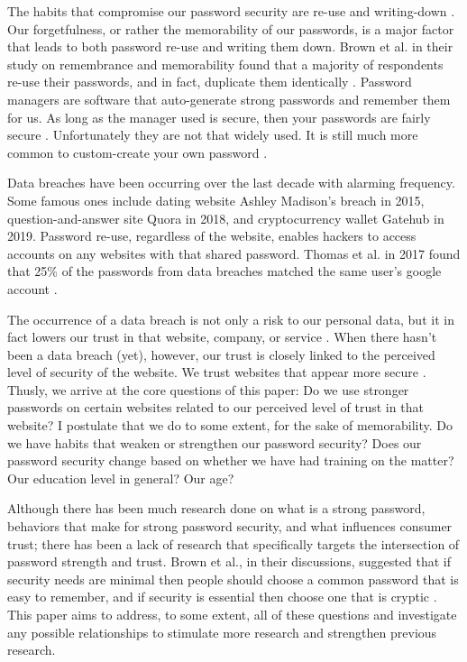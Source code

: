\documentclass[letterpaper, 10 pt, conference]{ieeeconf}  %
\begin{document}
The habits that compromise our password security are re-use and writing-down \cite{Dhamija2000}. Our forgetfulness, or rather the memorability of our passwords, is a major factor that leads to both password re-use and writing them down. Brown et al. in their study on remembrance and memorability found that a majority of respondents re-use their passwords, and in fact, duplicate them identically \cite{Brown2004}. Password managers are software that auto-generate strong passwords and remember them for us. As long as the manager used is secure, then your passwords are fairly secure \cite{Alkaldi2016}. Unfortunately they are not that widely used. It is still much more common to custom-create your own password \cite{Alkaldi2016}.

Data breaches have been occurring over the last decade with alarming frequency. Some famous ones include dating website Ashley Madison’s breach in 2015, question-and-answer site Quora in 2018, and cryptocurrency wallet Gatehub in 2019. Password re-use, regardless of the website, enables hackers to access accounts on any websites with that shared password. Thomas et al. in 2017 found that 25\% of the passwords from data breaches matched the same user’s google account \cite{Thomas2017}. 

The occurrence of a data breach is not only a risk to our personal data, but it in fact lowers our trust in that website, company, or service \cite{Curtis2018}. When there hasn’t been a data breach (yet), however, our trust is closely linked to the perceived level of security of the website. We trust websites that appear more secure \cite{Flavian2006}.
Thusly, we arrive at the core questions of this paper: Do we use stronger passwords on certain websites related to our perceived level of trust in that website? I postulate that we do to some extent, for the sake of memorability. Do we have habits that weaken or strengthen our password security? Does our password security change based on whether we have had training on the matter? Our education level in general? Our age? 

Although there has been much research done on what is a strong password, behaviors that make for strong password security, and what influences consumer trust; there has been a lack of research that specifically targets the intersection of password strength and trust. Brown et al., in their discussions, suggested that if security needs are minimal then people should choose a common password that is easy to remember, and if security is essential then choose one that is cryptic \cite{Brown2004}. This paper aims to address, to some extent, all of these questions and investigate any possible relationships to stimulate more research and strengthen previous research.
\end{document}
